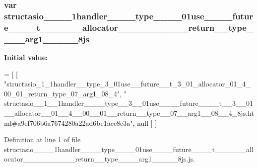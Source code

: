 \subsubsection[{structasio\+\_\+\+\_\+1\+\_\+\+\_\+1handler\+\_\+\+\_\+\+\_\+\+\_\+type\+\_\+\+\_\+3\+\_\+\+\_\+01use\+\_\+\+\_\+\+\_\+\+\_\+future\+\_\+\+\_\+\+\_\+\+\_\+t\+\_\+\+\_\+3\+\_\+\+\_\+01\+\_\+\+\_\+allocator\+\_\+\+\_\+01\+\_\+\+\_\+4\+\_\+\+\_\+00\+\_\+\+\_\+01\+\_\+\+\_\+return\+\_\+\+\_\+type\+\_\+\+\_\+07\+\_\+\+\_\+arg1\+\_\+\+\_\+08\+\_\+\+\_\+4\+\_\+8js}]{\setlength{\rightskip}{0pt plus 5cm}var structasio\+\_\+\+\_\+\_\+\+\_\+1handler\+\_\+\+\_\+\+\_\+\+\_\+type\+\_\+\+\_\+\_\+\+\_\+01use\+\_\+\+\_\+\+\_\+\+\_\+future\+\_\+\+\_\+\+\_\+\+\_\+t\+\_\+\+\_\+\_\+\+\_\+\_\+\+\_\+allocator\+\_\+\+\_\+\_\+\+\_\+\_\+\+\_\+\_\+\+\_\+\_\+\+\_\+return\+\_\+\+\_\+type\+\_\+\+\_\+\_\+\+\_\+arg1\+\_\+\+\_\+\_\+\+\_\+\_\+8js}\label{structasio____1____1handler________type____3____01use________future________t____3____01____allocf74423c043b8b52ab050625140a57c80_ab536e28a54556fbd4e68a1389a5aa4e8}
{\bfseries Initial value\+:}
\begin{DoxyCode}
=
[
    [ \textcolor{stringliteral}{"structasio\_1\_1handler\_\_type\_3\_01use\_\_future\_\_t\_3\_01\_allocator\_01\_4\_00\_01\_return\_type\_07\_arg1\_08\_4"}, \textcolor{stringliteral}{
      "
      structasio\_\_1\_\_1handler\_\_\_\_type\_\_3\_\_01use\_\_\_\_future\_\_\_\_t\_\_3\_\_01\_\_allocator\_\_01\_\_4\_\_00\_\_01\_\_return\_\_type\_\_07\_\_arg1\_\_08\_\_4\_8js.html#a9ef706b6a7674280a22ad6be1ace8c3a"}, null ]
]
\end{DoxyCode}


Definition at line 1 of file structasio\+\_\+\+\_\+\_\+\+\_\+1handler\+\_\+\+\_\+\+\_\+\+\_\+type\+\_\+\+\_\+\_\+\+\_\+01use\+\_\+\+\_\+\+\_\+\+\_\+future\+\_\+\+\_\+\+\_\+\+\_\+t\+\_\+\+\_\+\_\+\+\_\+\_\+\+\_\+allocator\+\_\+\+\_\+\_\+\+\_\+\_\+\+\_\+\_\+\+\_\+\_\+\+\_\+return\+\_\+\+\_\+type\+\_\+\+\_\+\_\+\+\_\+arg1\+\_\+\+\_\+\_\+\+\_\+\_\+8js.\+js.

